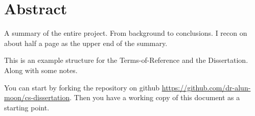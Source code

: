 
\chapter{Abstract}

A summary of the entire project.
From background to conclusions.
I recon on about half a page as the upper end of the summary.

This is an example structure for the Terms-of-Reference and the Dissertation.
Along with some notes.

You can start by forking the repository on github
\url{https://github.com/dr-alun-moon/cs-dissertation}.  Then you have a working copy of this document as a starting point.
